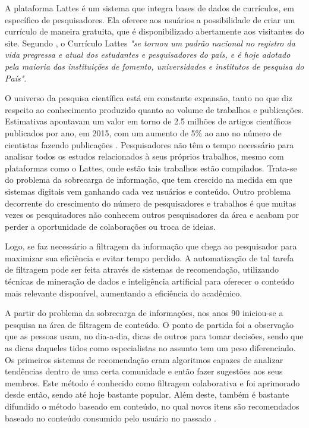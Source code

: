 \documentclass[12pt]{article}
\begin{document}
A plataforma Lattes é um sistema que integra bases de dados de currículos, em específico de pesquisadores. 
Ela oferece aos usuários a possibilidade de criar um currículo de maneira gratuita, que é disponibilizado 
abertamente aos visitantes do site. Segundo \cite{CNPq2019lattes}, o Currículo Lattes 
\textit{"se tornou um padrão nacional no registro da vida pregressa e atual dos estudantes e 
pesquisadores do país, e é hoje adotado pela maioria das instituições de fomento, universidades e 
institutos de pesquisa do País"}.
    
O universo da pesquisa científica está em constante expansão, tanto no que diz respeito ao conhecimento 
produzido quanto ao volume de trabalhos e publicações. Estimativas apontavam um valor em torno de 2.5 
milhões de artigos científicos publicados por ano, em 2015, com um aumento de 5\% ao ano no número de 
cientistas fazendo publicações \cite{ware2015stm}. Pesquisadores não têm o tempo necessário para analisar 
todos os estudos relacionados à seus próprios trabalhos, mesmo com plataformas como o Lattes, onde estão 
tais trabalhos estão compilados. Trata-se do problema da sobrecarga de informação, que tem crescido na 
medida em que sistemas digitais vem ganhando cada vez usuários e conteúdo. Outro problema decorrente do 
crescimento do número de pesquisadores e trabalhos é que muitas vezes os pesquisadores não conhecem outros 
pesquisadores da área e acabam por perder a oportunidade de colaborações ou troca de ideias.

Logo, se faz necessário a filtragem da informação que chega ao pesquisador para maximizar sua eficiência e 
evitar tempo perdido. A automatização de tal tarefa de filtragem pode ser feita através de sistemas de recomendação, 
utilizando técnicas de mineração de dados e inteligência artificial para oferecer o conteúdo mais relevante 
disponível, aumentando a eficiência do acadêmico. 

A partir do problema da sobrecarga de informações, nos anos 90 iniciou-se a pesquisa na área de filtragem de conteúdo. 
O ponto de partida foi a observação que as pessoas usam, no dia-a-dia, dicas de outros para tomar decisões, sendo que 
as dicas daqueles tidos como especialistas no assunto tem um peso diferenciado. Os primeiros sistemas de recomendação 
eram algoritmos capazes de analizar tendências dentro de uma certa comunidade e então fazer sugestões aos seus membros. 
Este método é conhecido como filtragem colaborativa e foi aprimorado desde então, sendo até hoje bastante popular. Além 
deste, também é bastante difundido o método baseado em conteúdo, no qual novos itens são recomendados baseado no 
conteúdo consumido pelo usuário no passado \cite{ricci2011introduction}.
\end{document}
